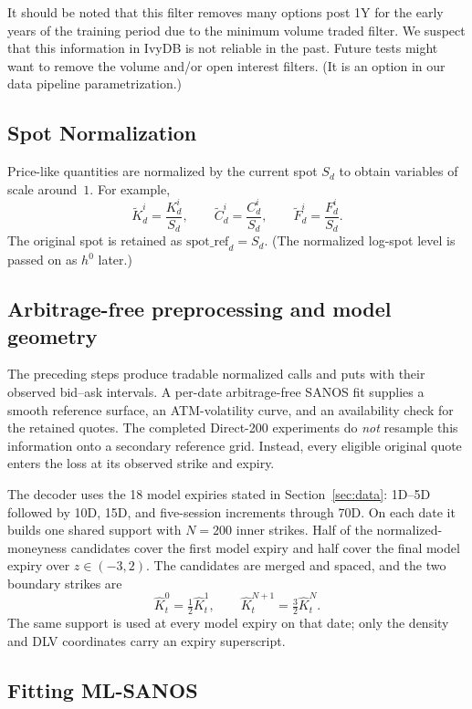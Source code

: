 \documentclass[11pt,a4paper]{article}
\begin{document}
It should be noted that this filter removes many options post 1Y for the early years of the training period due to the minimum volume
traded filter. We suspect that this information in IvyDB is not reliable in the past.
Future tests might want to remove the volume and/or open interest filters. (It is an option
in our data pipeline parametrization.)

\subsection{Spot Normalization}

Price-like quantities are normalized by the current spot \(S_d\) to obtain
variables of scale around~$1$. For example,
%
\[
    \widetilde{K}_d^i
    =
    \frac{K_d^i}{S_d},
    \qquad
    \widetilde{C}_d^i
    =
    \frac{C_d^i}{S_d},
    \qquad
    \widetilde{F}_d^i
    =
    \frac{F_d^i}{S_d}.
\]
The original spot is retained as
$
    \mathrm{spot\_ref}_d = S_d.
$
(The normalized log-spot level is passed on as $h^0$ later.)

\subsection{Arbitrage-free preprocessing and model geometry}

The preceding steps produce tradable normalized calls and puts with their
observed bid--ask intervals.  A per-date arbitrage-free SANOS fit supplies a
smooth reference surface, an ATM-volatility curve, and an availability check
for the retained quotes.  The completed Direct-200 experiments do
\emph{not} resample this information onto a secondary reference grid.
Instead, every eligible original quote enters the loss at its observed strike
and expiry.

The decoder uses the 18 model expiries stated in Section~\ref{sec:data}:
1D--5D followed by 10D, 15D, and five-session increments through 70D.  On
each date it builds one shared support with $N=200$ inner strikes. Half of the normalized-moneyness
candidates cover the first model expiry and half cover the final model expiry
over $z\in(-3,2)$.  The candidates are merged and spaced, and the two boundary
strikes are
\[
  \hat K_t^0=\tfrac12\hat K_t^1,
  \qquad
  \hat K_t^{N+1}=\tfrac32\hat K_t^N.
\]
The same support is used at every model expiry on that date; only the density
and DLV coordinates carry an expiry superscript.

\subsection{Fitting ML-SANOS}
\end{document}
